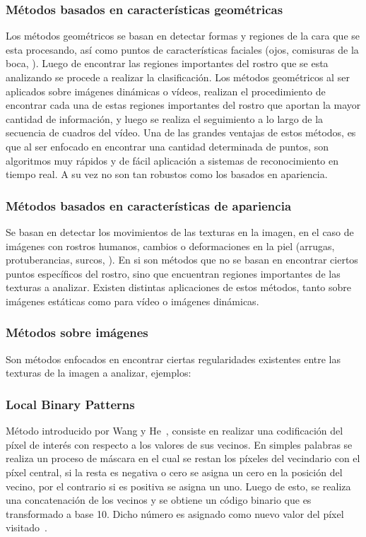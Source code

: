 \subsubsection{Métodos basados en características geométricas}
\label{sec:met_geo}
Los métodos geométricos se basan en detectar formas y regiones de la cara que se esta procesando, así como puntos de características faciales (\eg ojos, comisuras de la boca, \etc). 
Luego de encontrar las regiones importantes del rostro que se esta analizando se procede a realizar la clasificación. Los métodos geométricos al ser aplicados sobre imágenes dinámicas o vídeos, realizan el procedimiento de encontrar cada una de estas regiones importantes del rostro que aportan la mayor cantidad de información, y luego se realiza el seguimiento a lo largo de la secuencia de cuadros del vídeo. Una de las grandes ventajas de estos métodos, es que al ser enfocado en encontrar una cantidad determinada de puntos, son algoritmos muy rápidos y de fácil aplicación a sistemas de reconocimiento en tiempo real. A su vez no son tan robustos como los basados en apariencia.


\subsubsection{Métodos basados en características de apariencia}
\label{sec:met_apa}
Se basan en detectar los movimientos de las texturas en la imagen, en el caso de imágenes con rostros humanos, cambios o deformaciones en la piel (\eg arrugas, protuberancias, surcos, \etc). En si son métodos que no se basan en encontrar ciertos puntos específicos del rostro, sino que encuentran regiones importantes de las texturas a analizar. Existen distintas aplicaciones de estos métodos, tanto sobre imágenes estáticas como para vídeo o imágenes dinámicas.  

	\subsubsection{Métodos sobre imágenes}
	\label{sec:met_imagen}
		Son métodos enfocados en encontrar ciertas regularidades existentes entre las texturas de la imagen a analizar, ejemplos:

		\subsubsection{Local Binary Patterns}
		\label{sec:lbp}
		Método introducido por Wang y He~\cite{Wang1990}, consiste en realizar una codificación del píxel de interés con respecto a los valores de sus vecinos. En simples palabras se realiza un proceso de máscara en el cual se restan los píxeles del vecindario con el píxel central, si la resta es negativa o cero se asigna un cero en la posición del vecino, por el contrario si es positiva se asigna un uno. Luego de esto, se realiza una concatenación de los vecinos y se obtiene un código binario que es transformado a base 10. Dicho número es asignado como nuevo valor del píxel visitado~\cite{Ojala1994,Ojala2002,Ahonen2004,Shan2009}.

